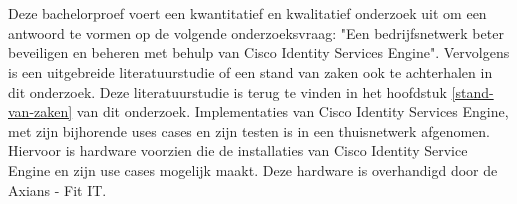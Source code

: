 
\chapter{}
\label{ch:methodologie}


Deze bachelorproef voert een kwantitatief en kwalitatief onderzoek uit om een antwoord te vormen op de volgende onderzoeksvraag: "Een bedrijfsnetwerk beter beveiligen en beheren met behulp van Cisco Identity Services Engine". 
\newline
\newline
Vervolgens is een uitgebreide literatuurstudie of een stand van zaken ook te achterhalen in dit onderzoek. Deze literatuurstudie is terug te vinden in het hoofdstuk \ref{stand-van-zaken} van dit onderzoek. Implementaties van Cisco Identity Services Engine, met zijn bijhorende uses cases en zijn testen is in een thuisnetwerk afgenomen. Hiervoor is hardware voorzien die de installaties van Cisco Identity Service Engine en zijn use cases mogelijk maakt. Deze hardware is overhandigd door de Axians - Fit IT.
\newline
\newline
